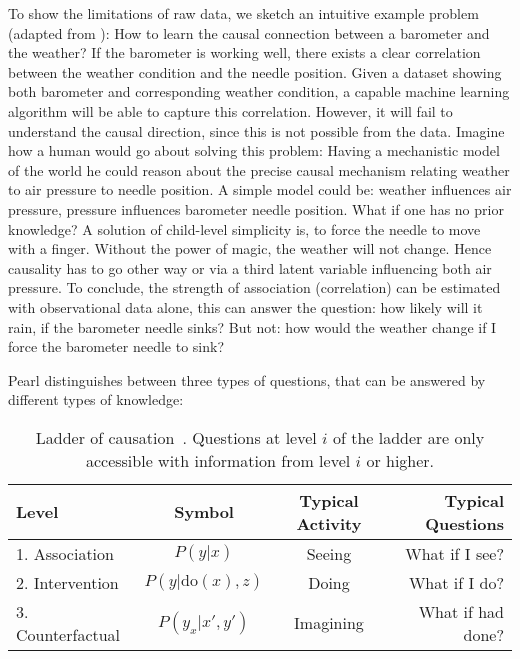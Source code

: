 		To show the limitations of raw data, we sketch an intuitive example problem (adapted from \cite{pearl18why}):
		How to learn the causal connection between a barometer and the weather? If the barometer is working well, there exists a clear correlation between the weather condition and the needle position. Given a dataset showing both barometer and corresponding weather condition, a capable machine learning algorithm will be able to capture this correlation. However, it will fail to understand the causal direction, since this is not possible from the data.
		Imagine how a human would go about solving this problem:
		Having a mechanistic model of the world he could reason about the precise causal mechanism relating weather to air pressure to needle position. A simple model could be: weather influences air pressure, pressure influences barometer needle position.
		What if one has no prior knowledge? A solution of child-level simplicity is, to force the needle to move with a finger. Without the power of magic, the weather will not change. Hence causality has to go other way or via a third latent variable influencing both \ie air pressure.
		To conclude, the strength of association (correlation) can be estimated with observational data alone, this can answer the question: how likely will it rain, if the barometer needle sinks? But not: how would the weather change if I force the barometer needle to sink?

		Pearl \cite{pearl18why} distinguishes between three types of questions, that can be answered by different types of knowledge:
		\begin{table}[htp]
			\centering
			\caption{Ladder of causation~\cite{pearl18impediments}. Questions at level $i$ of the ladder are only accessible with information from level $i$ or higher.}
			\label{tab:overview}
			\begin{tabular}{l|ccr}
				\hline
				Level & Symbol & Typical Activity & Typical Questions \\ \hline
				1. Association & $P(y|x)$ & Seeing & What if I see?  \\
				2. Intervention& $P(y|\mathrm{do}(x), z)$ & Doing& What if I do?  \\
				3. Counterfactual& $P(y_x|x', y')$ & Imagining & What if had done?  \\ \hline
			\end{tabular}
		\end{table}

